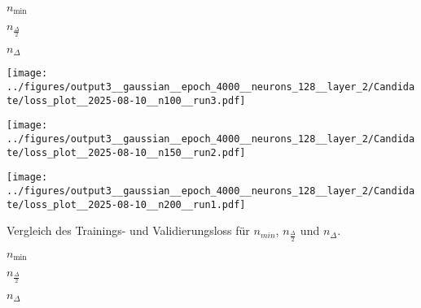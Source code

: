 \begin{otherlanguage}{ngerman}
\begin{samepage}
\begin{minipage}{\textwidth}
\label{fig:matrix_plot_gauss}

\begin{minipage}{0.05\textwidth}\vspace{0.5cm}\end{minipage}%
\begin{minipage}{0.3\textwidth}\centering \textbf{$n_{\mathrm{min}}$}\end{minipage}%
\begin{minipage}{0.3\textwidth}\centering \textbf{$n_{\frac{\Delta}{2}}$}\end{minipage}%
\begin{minipage}{0.3\textwidth}\centering \textbf{$n_{\Delta}$}\end{minipage}

\vspace{0.125cm}

\begin{minipage}{0.05\textwidth}\centering{}\end{minipage}%
\begin{minipage}{0.3\textwidth}
    \centering
    \texttt{[image: ../figures/output3\_\_gaussian\_\_epoch\_4000\_\_neurons\_128\_\_layer\_2/Candidate/loss\_plot\_\_2025-08-10\_\_n100\_\_run3.pdf]}
\end{minipage}%
\begin{minipage}{0.3\textwidth}
    \centering
    \texttt{[image: ../figures/output3\_\_gaussian\_\_epoch\_4000\_\_neurons\_128\_\_layer\_2/Candidate/loss\_plot\_\_2025-08-10\_\_n150\_\_run2.pdf]}
\end{minipage}%
\begin{minipage}{0.3\textwidth}
    \centering
    \texttt{[image: ../figures/output3\_\_gaussian\_\_epoch\_4000\_\_neurons\_128\_\_layer\_2/Candidate/loss\_plot\_\_2025-08-10\_\_n200\_\_run1.pdf]}
\end{minipage}

\caption{Vergleich des Trainings- und Validierungsloss für $n_{min}$, $n_{\frac{\Delta}{2}}$ und $n_{\Delta}$.}
\label{fig:matrix_plot}

\begin{minipage}{0.05\textwidth}\vspace{0.5cm}\end{minipage}%
\begin{minipage}{0.3\textwidth}\centering \textbf{$n_{\mathrm{min}}$}\end{minipage}%
\begin{minipage}{0.3\textwidth}\centering \textbf{$n_{\frac{\Delta}{2}}$}\end{minipage}%
\begin{minipage}{0.3\textwidth}\centering \textbf{$n_{\Delta}$}\end{minipage}


\end{minipage}
\end{samepage}
\end{otherlanguage}
